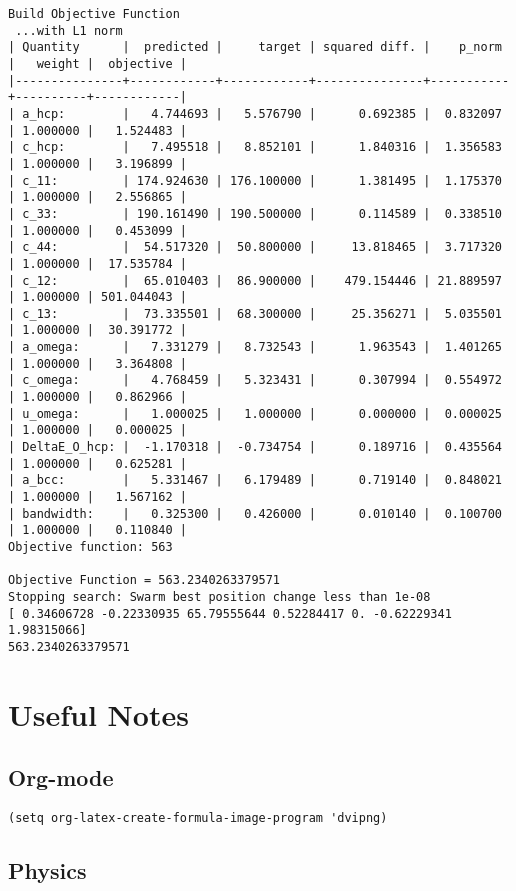 \documentclass[11pt]{article}
\begin{document}
\begin{verbatim}
Build Objective Function
 ...with L1 norm 
| Quantity      |  predicted |     target | squared diff. |    p_norm |   weight |  objective |
|---------------+------------+------------+---------------+-----------+----------+------------|
| a_hcp:        |   4.744693 |   5.576790 |      0.692385 |  0.832097 | 1.000000 |   1.524483 |
| c_hcp:        |   7.495518 |   8.852101 |      1.840316 |  1.356583 | 1.000000 |   3.196899 |
| c_11:         | 174.924630 | 176.100000 |      1.381495 |  1.175370 | 1.000000 |   2.556865 |
| c_33:         | 190.161490 | 190.500000 |      0.114589 |  0.338510 | 1.000000 |   0.453099 |
| c_44:         |  54.517320 |  50.800000 |     13.818465 |  3.717320 | 1.000000 |  17.535784 |
| c_12:         |  65.010403 |  86.900000 |    479.154446 | 21.889597 | 1.000000 | 501.044043 |
| c_13:         |  73.335501 |  68.300000 |     25.356271 |  5.035501 | 1.000000 |  30.391772 |
| a_omega:      |   7.331279 |   8.732543 |      1.963543 |  1.401265 | 1.000000 |   3.364808 |
| c_omega:      |   4.768459 |   5.323431 |      0.307994 |  0.554972 | 1.000000 |   0.862966 |
| u_omega:      |   1.000025 |   1.000000 |      0.000000 |  0.000025 | 1.000000 |   0.000025 |
| DeltaE_O_hcp: |  -1.170318 |  -0.734754 |      0.189716 |  0.435564 | 1.000000 |   0.625281 |
| a_bcc:        |   5.331467 |   6.179489 |      0.719140 |  0.848021 | 1.000000 |   1.567162 |
| bandwidth:    |   0.325300 |   0.426000 |      0.010140 |  0.100700 | 1.000000 |   0.110840 |
Objective function: 563 

Objective Function = 563.2340263379571 
Stopping search: Swarm best position change less than 1e-08 
[ 0.34606728 -0.22330935 65.79555644 0.52284417 0. -0.62229341 1.98315066] 
563.2340263379571
\end{verbatim}


\section{Useful Notes}
\label{sec-3}
\subsection{Org-mode}
\label{sec-3-1}
\begin{verbatim}
(setq org-latex-create-formula-image-program 'dvipng)
\end{verbatim}

\subsection{Physics}
\label{sec-3-2}
\end{document}
